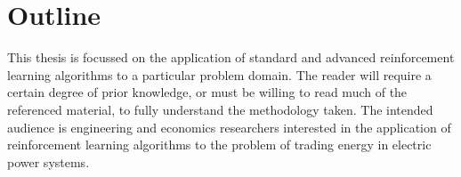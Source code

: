 
\section{Outline}%
This thesis is focussed on the application of standard and advanced
reinforcement learning algorithms to a particular problem domain.  The reader
will require a certain degree of prior knowledge, or must be willing to read
much of the referenced material, to fully understand the methodology taken.
The intended audience is engineering and economics researchers interested in
the application of reinforcement learning algorithms to the problem of trading
energy in electric power systems.



